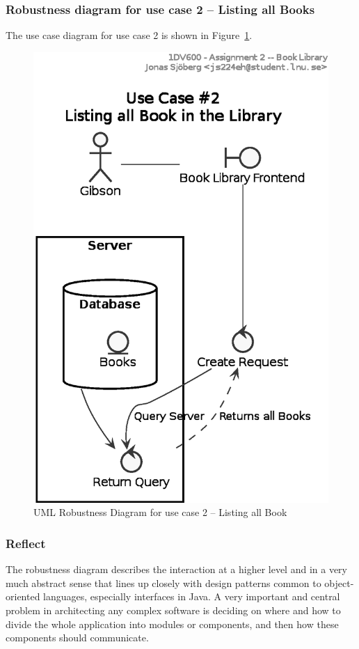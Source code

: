 \subsubsection{Robustness diagram for use case 2 -- Listing all Books}\label{task-1b-robust2}
The use case diagram for use case 2 is shown in Figure~\ref{fig:uml-usecase2rob}.

\begin{figure}[htbp]
  \centering
  \includegraphics[width=0.75\linewidth]{include/uml-use-case-2-rob.eps}
  \caption{UML Robustness Diagram for use case 2 -- Listing all Book}
  \label{fig:uml-usecase2rob}
\end{figure}


\subsubsection{Reflect}\label{task-1b-reflect}
The robustness diagram describes the interaction at a higher level and in a
very much abstract sense  that lines up closely with design patterns common to
object-oriented languages, especially interfaces in Java.
A very important and central problem in architecting any complex software is
deciding on where and how to divide the whole application into modules or
components, and then how these components should communicate.

